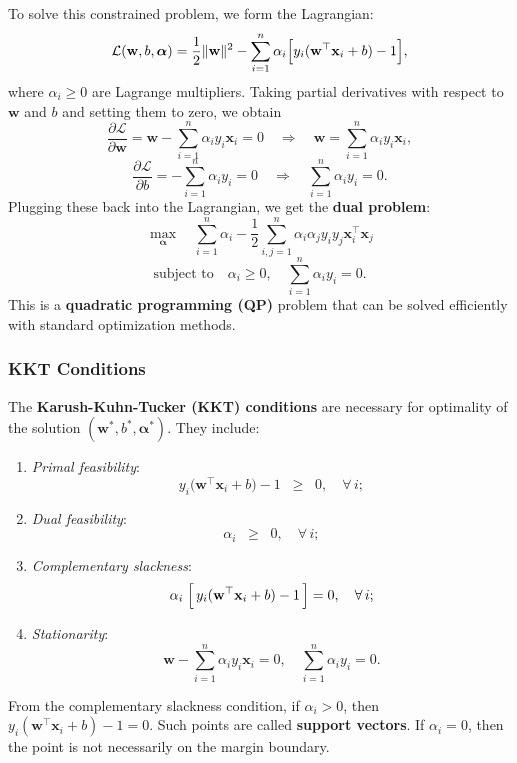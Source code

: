 \documentclass[11pt]{article}
\begin{document}
To solve this constrained problem, we form the Lagrangian:
\[
\mathcal{L}(\mathbf{w}, b, \boldsymbol{\alpha}) 
= \frac{1}{2}\|\mathbf{w}\|^2 
- \sum_{i=1}^n \alpha_i \Bigl[y_i(\mathbf{w}^\top \mathbf{x}_i + b) - 1\Bigr],
\]
where \(\alpha_i \ge 0\) are Lagrange multipliers. Taking partial derivatives with respect to \(\mathbf{w}\) and \(b\) and setting them to zero, we obtain
\[
\frac{\partial \mathcal{L}}{\partial \mathbf{w}} 
= \mathbf{w} - \sum_{i=1}^n \alpha_i y_i \mathbf{x}_i = 0
\quad \Longrightarrow \quad 
\mathbf{w} = \sum_{i=1}^n \alpha_i y_i \mathbf{x}_i,
\]
\[
\frac{\partial \mathcal{L}}{\partial b} 
= -\sum_{i=1}^n \alpha_i y_i = 0
\quad \Longrightarrow \quad 
\sum_{i=1}^n \alpha_i y_i = 0.
\]
Plugging these back into the Lagrangian, we get the \textbf{dual problem}:
\[
\max_{\boldsymbol{\alpha}} 
\quad \sum_{i=1}^n \alpha_i 
- \frac{1}{2}\sum_{i,j=1}^n \alpha_i \alpha_j y_i y_j \mathbf{x}_i^\top \mathbf{x}_j
\]
\[
\text{subject to} 
\quad \alpha_i \ge 0, 
\quad \sum_{i=1}^n \alpha_i y_i = 0.
\]
This is a \textbf{quadratic programming (QP)} problem that can be solved efficiently with standard optimization methods.

\subsubsection{KKT Conditions}
\label{subsec:kkt}

The \textbf{Karush-Kuhn-Tucker (KKT) conditions} are necessary for optimality of the solution \((\mathbf{w}^*, b^*, \boldsymbol{\alpha}^*)\). They include:
\begin{enumerate}
    \item \textit{Primal feasibility}:
    \[
    y_i \bigl(\mathbf{w}^\top \mathbf{x}_i + b\bigr) - 1 \;\;\geq\;\; 0, 
    \quad \forall\, i;
    \]
    \item \textit{Dual feasibility}:
    \[
    \alpha_i \;\;\geq\;\; 0,
    \quad \forall\, i;
    \]
    \item \textit{Complementary slackness}:
    \[
    \alpha_i \;\Bigl[\,y_i(\mathbf{w}^\top \mathbf{x}_i + b) - 1\,\Bigr] = 0,
    \quad \forall\, i;
    \]
    \item \textit{Stationarity}:
    \[
    \mathbf{w} - \sum_{i=1}^n \alpha_i y_i \mathbf{x}_i = 0,
    \quad \sum_{i=1}^n \alpha_i y_i = 0.
    \]
\end{enumerate}
From the complementary slackness condition, if \(\alpha_i > 0\), then \(y_i(\mathbf{w}^\top \mathbf{x}_i + b) - 1 = 0\). Such points are called \textbf{support vectors}. If \(\alpha_i=0\), then the point is not necessarily on the margin boundary.
\end{document}
